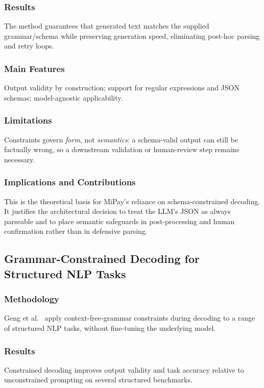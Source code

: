 \subsubsection{Results}
The method guarantees that generated text matches the supplied
grammar/schema while preserving generation speed, eliminating post-hoc parsing
and retry loops.

\subsubsection{Main Features}
Output validity by construction; support for regular expressions and JSON
schemas; model-agnostic applicability.

\subsubsection{Limitations}
Constraints govern \emph{form}, not \emph{semantics}: a schema-valid output can
still be factually wrong, so a downstream validation or human-review step remains
necessary.

\subsubsection{Implications and Contributions}
This is the theoretical basis for MiPay's reliance on schema-constrained
decoding. It justifies the architectural decision to treat the LLM's JSON as
always parseable and to place semantic safeguards in post-processing and human
confirmation rather than in defensive parsing.

\subsection{Grammar-Constrained Decoding for Structured NLP Tasks}

\subsubsection{Methodology}
Geng et al.~\cite{geng2023grammar} apply context-free-grammar constraints during
decoding to a range of structured NLP tasks, without fine-tuning the underlying
model.

\subsubsection{Results}
Constrained decoding improves output validity and task accuracy relative to
unconstrained prompting on several structured benchmarks.

